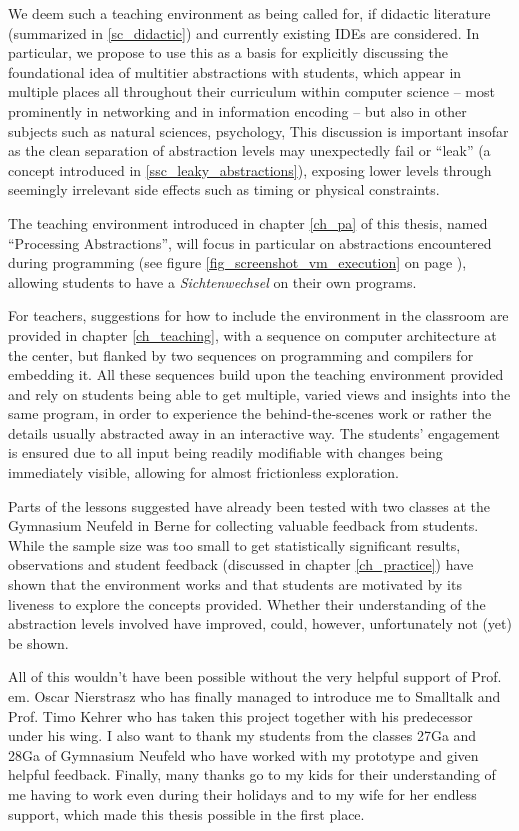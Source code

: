 We deem such a teaching environment as being called for, if didactic literature (summarized in \ref{sc_didactic}) and currently existing \acp{IDE} are considered. In particular, we propose to use this as a basis for explicitly discussing the foundational idea of multitier abstractions with students, which appear in multiple places all throughout their curriculum within computer science -- most prominently in networking and in information encoding -- but also in other subjects such as natural sciences, psychology, \etc This discussion is important insofar as the clean separation of abstraction levels may unexpectedly fail or ``leak'' (a concept introduced in \ref{ssc_leaky_abstractions}), exposing lower levels through seemingly irrelevant side effects such as timing or physical constraints.

The teaching environment introduced in chapter \ref{ch_pa} of this thesis, named ``Processing Abstractions'', will focus in particular on abstractions encountered during programming (see \eg figure \ref{fig_screenshot_vm_execution} on page \pageref{fig_screenshot_vm_execution}), allowing students to have a \emph{Sichtenwechsel} on their own programs.

For teachers, suggestions for how to include the environment in the classroom are provided in chapter \ref{ch_teaching}, with a sequence on computer architecture at the center, but flanked by two sequences on programming and compilers for embedding it. All these sequences build upon the teaching environment provided and rely on students being able to get multiple, varied views and insights into the same program, in order to experience the behind-the-scenes work or rather the details usually abstracted away in an interactive way. The students' engagement is ensured due to all input being readily modifiable with changes being immediately visible, allowing for almost frictionless exploration.

Parts of the lessons suggested have already been tested with two classes at the Gymnasium Neufeld in Berne for collecting valuable feedback from students. While the sample size was too small to get statistically significant results, observations and student feedback (discussed in chapter \ref{ch_practice}) have shown that the environment works and that students are motivated by its liveness to explore the concepts provided. Whether their understanding of the abstraction levels involved have improved, could, however, unfortunately not (yet) be shown.

All of this wouldn't have been possible without the very helpful support of Prof.\,em. Oscar Nierstrasz who has finally managed to introduce me to Smalltalk and Prof. Timo Kehrer who has taken this project together with his predecessor under his wing. I also want to thank my students from the classes 27Ga and 28Ga of Gymnasium Neufeld who have worked with my prototype and given helpful feedback. Finally, many thanks go to my kids for their understanding of me having to work even during their holidays and to my wife for her endless support, which made this thesis possible in the first place.
